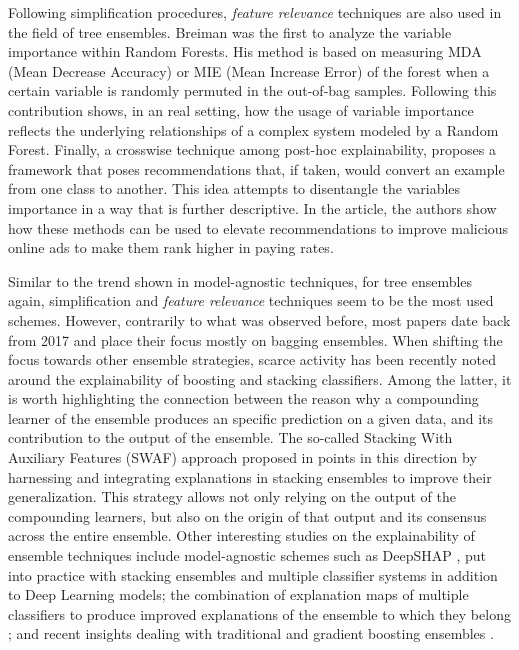 \documentclass[final]{elsarticle}
\begin{document}
Following simplification procedures, \textit{feature relevance} techniques are also used in the field of tree ensembles. Breiman \cite{CostComplexityPrunning} was the first to analyze the variable importance within Random Forests. His method is based on measuring MDA (Mean Decrease Accuracy) or MIE (Mean Increase Error) of the forest when a certain variable is randomly permuted in the out-of-bag samples. Following this contribution \cite{auret2012interpretation} shows, in an real setting, how the usage of variable importance reflects the underlying relationships of a complex system modeled by a Random Forest. Finally, a crosswise technique among post-hoc explainability, \cite{FeatureTweaking} proposes a framework that poses recommendations that, if taken, would convert an example from one class to another. This idea attempts to disentangle the variables importance in a way that is further descriptive. In the article, the authors show how these methods can be used to elevate recommendations to improve malicious online ads to make them rank higher in paying rates.

Similar to the trend shown in model-agnostic techniques, for tree ensembles again, simplification and \textit{feature relevance} techniques seem to be the most used schemes. However, contrarily to what was observed before, most papers date back from 2017 {\color{black}and place their focus mostly on bagging ensembles. When shifting the focus towards other ensemble strategies, scarce activity has been recently noted around the explainability of boosting and stacking classifiers. Among the latter, it is worth highlighting the connection between the reason why a compounding learner of the ensemble produces an specific prediction on a given data, and its contribution to the output of the ensemble. The so-called Stacking With Auxiliary Features (SWAF) approach proposed in \cite{rajani2018stacking} points in this direction by harnessing and integrating explanations in stacking ensembles to improve their generalization. This strategy allows not only relying on the output of the compounding learners, but also on the origin of that output and its consensus across the entire ensemble. Other interesting studies on the explainability of ensemble techniques include model-agnostic schemes such as DeepSHAP \cite{1911.11888}, put into practice with stacking ensembles and multiple classifier systems in addition to Deep Learning models; the combination of explanation maps of multiple classifiers to produce improved explanations of the ensemble to which they belong \cite{rajani2018ensembling}; and recent insights dealing with traditional and gradient boosting ensembles \cite{1907.02582, 1802.03888}}.
\end{document}
